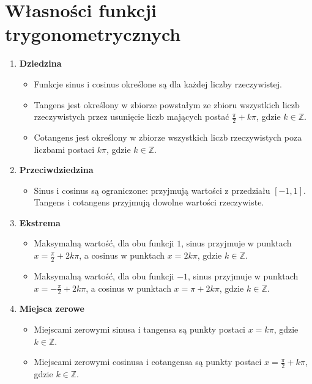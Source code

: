 \documentclass[a4paper,12pt]{article}
\begin{document}
\newpage

\section{Własności funkcji trygonometrycznych}

\begin{enumerate}
    \item \textbf{Dziedzina}
    \begin{itemize}
        \item Funkcje sinus i cosinus określone są dla każdej liczby rzeczywistej.
        \item Tangens jest określony w zbiorze powstałym ze zbioru wszystkich liczb rzeczywistych przez usunięcie liczb mających postać $\frac{\pi}{2} + k\pi$, gdzie $k \in \mathbb{Z}$.
        \item Cotangens jest określony w zbiorze wszystkich liczb rzeczywistych poza liczbami postaci $k \pi$, gdzie $k \in \mathbb{Z}$.
    \end{itemize}
    
    \item \textbf{Przeciwdziedzina}
    \begin{itemize}
        \item Sinus i cosinus są ograniczone: przyjmują wartości z przedziału $[-1,1]$. Tangens i cotangens przyjmują dowolne wartości rzeczywiste.
    \end{itemize}
    
    \item \textbf{Ekstrema}
    \begin{itemize}
        \item Maksymalną wartość, dla obu funkcji $1$, sinus przyjmuje w punktach $x = \frac{\pi}{2} + 2k\pi$, a cosinus w punktach $x = 2k\pi$, gdzie $k \in \mathbb{Z}$.
        \item Maksymalną wartość, dla obu funkcji $-1$, sinus przyjmuje w punktach $x = -\frac{\pi}{2} + 2k\pi$, a cosinus w punktach $x = \pi + 2k\pi$, gdzie $k \in \mathbb{Z}$.
    \end{itemize}
    
    \item \textbf{Miejsca zerowe}
    \begin{itemize}
        \item Miejscami zerowymi sinusa i tangensa są punkty postaci $x = k\pi$, gdzie $k \in \mathbb{Z}$.
        \item Miejscami zerowymi cosinusa i cotangensa są punkty postaci $x = \frac{\pi}{2} + k\pi$, gdzie $k \in \mathbb{Z}$.
    \end{itemize}
    

\end{enumerate}
\end{document}
